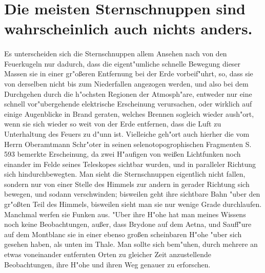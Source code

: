 \documentclass[a4paper, 11pt, oneside, polutonikogreek, german]{article}
\begin{document}
\section{Die meisten Sternschnuppen sind wahrscheinlich auch nichts anders.}
\paragraph{}
Es unterscheiden sich die Sternschnuppen allem Ansehen nach von den Feuerkugeln nur dadurch, dass die eigent"umliche schnelle Bewegung dieser Massen sie in einer gr"oßeren Entfernung bei der Erde vorbeif"uhrt, so, dass sie von derselben nicht bis zum Niederfallen angezogen werden, und also bei dem Durchgehen durch die h"ochsten Regionen der Atmosph"are, entweder nur eine schnell vor"ubergehende elektrische Erscheinung verursachen, oder wirklich auf einige Augenblicke in Brand geraten, welches Brennen sogleich wieder aush"ort, wenn sie sich wieder so weit von der Erde entfernen, dass die Luft zu Unterhaltung des Feuers zu d"unn ist. Vielleiche geh"ort auch hierher die vom Herrn Oberamtmann Schr"oter in seinen selenotopogrophischen Fragmenten S. 593 bemerkte Erscheinung, da zwei H"aufigen von weißen Lichtfunken noch einander im Felde seines Teleskopes sichtbar wurden, und in paralleler Richtung sich hindurchbewegten. Man sieht die Sternschnuppen eigentlich nicht fallen, sondern nur von einer Stelle des Himmels zur andern in gerader Richtung sich bewegen, und sodann verschwinden; bisweilen geht ihre sichtbare Bahn "uber den gr"oßten Teil des Himmels, bisweilen sieht man sie nur wenige Grade durchlaufen. Manchmal werfen sie Funken aus. "Uber ihre H"ohe hat man meines Wissens noch keine Beobachtungen, außer, dass Brydone auf dem Aetna, und Sauff"ure auf dem Montblanc sie in einer ebenso großen scheinbaren H"ohe "uber sich gesehen haben, als unten im Thale. Man sollte sich bem"uhen, durch mehrere an etwas voneinander entfernten Orten zu gleicher Zeit anzustellende Beobachtungen, ihre H"ohe und ihren Weg genauer zu erforschen.
\end{document}
